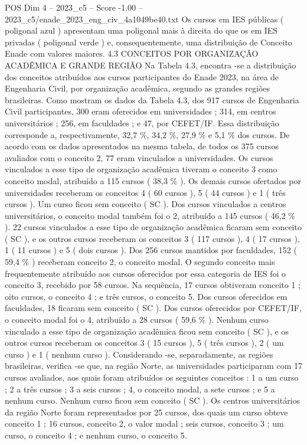 \begin{textsample}{POS Dim 4 – 2023\_c5 – Score -1.00 – 2023\_c5/enade\_2023\_eng\_civ\_4a1049be40.txt}
Os cursos em IES públicas ( poligonal azul ) apresentam uma poligonal mais à direita do que os em IES privadas ( poligonal verde ) e, consequentemente, uma distribuição de Conceito Enade com valores maiores. 4.3 CONCEITOS POR ORGANIZAÇÃO ACADÊMICA E GRANDE REGIÃO Na Tabela 4.3, encontra -se a distribuição dos conceitos atribuídos aos cursos participantes do Enade 2023, na área de Engenharia Civil, por organização acadêmica, segundo as grandes regiões brasileiras.
Como mostram os dados da Tabela 4.3, dos 917 cursos de Engenharia Civil participantes, 300 eram oferecidos em universidades ; 314, em centros universitários ; 256, em faculdades ; e 47, por CEFET/IF.
Essa distribuição corresponde a, respectivamente, 32,7 \%, 34,2 \%, 27,9 \% e 5,1 \% dos cursos.
De acordo com os dados apresentados na mesma tabela, de todos os 375 cursos avaliados com o conceito 2, 77 eram vinculados a universidades.
Os cursos vinculados a esse tipo de organização acadêmica tiveram o conceito 3 como conceito modal, atribuído a 115 cursos ( 38,3 \% ).
Os demais cursos ofertados por universidades receberam os conceitos 4 ( 60 cursos ), 5 ( 44 cursos ) e 1 ( três cursos ).
Um curso ficou sem conceito ( SC ).
Dos cursos vinculados a centros universitários, o conceito modal também foi o 2, atribuído a 145 cursos ( 46,2 \% ). 22 cursos vinculados a esse tipo de organização acadêmica ficaram sem conceito ( SC ), e os outros cursos receberam os conceitos 3 ( 117 cursos ), 4 ( 17 cursos ), 1 ( 11 cursos ) e 5 ( dois cursos ).
Dos 256 cursos mantidos por faculdades, 152 ( 59,4 \% ) receberam conceito 2, o conceito modal.
O segundo conceito mais frequentemente atribuído aos cursos oferecidos por essa categoria de IES foi o conceito 3, recebido por 58 cursos.
Na sequência, 17 cursos obtiveram conceito 1 ; oito cursos, o conceito 4 ; e três cursos, o conceito 5.
Dos cursos oferecidos em faculdades, 18 ficaram sem conceito ( SC ).
Dos cursos oferecidos por CEFET/IF, o conceito modal foi o 4, atribuído a 28 cursos ( 59,6 \% ).
Nenhum curso vinculado a esse tipo de organização acadêmica ficou sem conceito ( SC ), e os outros cursos receberam os conceitos 3 ( 15 cursos ), 5 ( três cursos ), 2 ( um curso ) e 1 ( nenhum curso ).
Considerando -se, separadamente, as regiões brasileiras, verifica -se que, na região Norte, as universidades participaram com 17 cursos avaliados, aos quais foram atribuídos os seguintes conceitos : 1 a um curso ; 2 a três cursos ; 3 a seis cursos ; 4, o conceito modal, a sete cursos ; e 5 a nenhum curso.
Nenhum curso ficou sem conceito ( SC ).
Os centros universitários da região Norte foram representados por 25 cursos, dos quais um curso obteve conceito 1 ; 16 cursos, conceito 2, o valor modal ; seis cursos, conceito 3 ; um curso, o conceito 4 ; e nenhum curso, o conceito 5.

\end{textsample}
